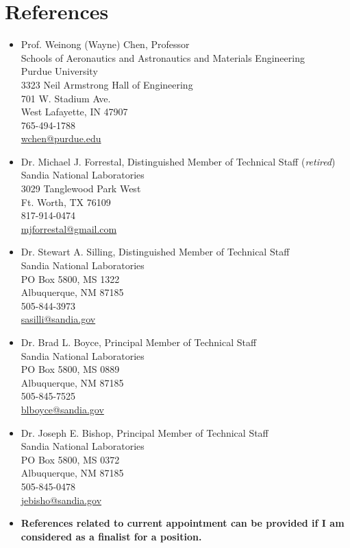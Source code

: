 \section*{References}

\begin{itemize}

    \item Prof. Weinong (Wayne) Chen, Professor \\ Schools of Aeronautics and Astronautics and Materials Engineering \\ Purdue University\\ 3323 Neil Armstrong Hall of Engineering \\ 701 W. Stadium Ave. \\ West Lafayette, IN 47907 \\ 765-494-1788 \\ \href{mailto:wchen@purdue.edu}{wchen@purdue.edu}

    \item Dr. Michael J. Forrestal, Distinguished Member of Technical Staff ({\it retired}) \\ Sandia National Laboratories\\ 3029 Tanglewood Park West \\ Ft. Worth, TX 76109 \\ 817-914-0474 \\ \href{mailto:mjforrestal@gmail.com}{mjforrestal@gmail.com}

    \item Dr. Stewart A. Silling, Distinguished Member of Technical Staff \\ Sandia National Laboratories\\ PO Box 5800, MS 1322 \\ Albuquerque, NM 87185\\ 505-844-3973 \\ \href{mailto:sasilli@sandia.gov}{sasilli@sandia.gov}
    
    \item Dr. Brad L. Boyce, Principal Member of Technical Staff \\ Sandia National Laboratories\\ PO Box 5800, MS 0889 \\ Albuquerque, NM 87185\\ 505-845-7525 \\ \href{mailto:blboyce@sandia.gov}{blboyce@sandia.gov}

    \item Dr. Joseph E. Bishop, Principal Member of Technical Staff \\ Sandia National Laboratories\\ PO Box 5800, MS 0372\\ Albuquerque, NM 87185\\ 505-845-0478 \\ \href{mailto:jebisho@sandia.gov}{jebisho@sandia.gov}

    \item {\bf References related to current appointment can be provided if I am considered as a finalist for a position.}

  \end{itemize}

